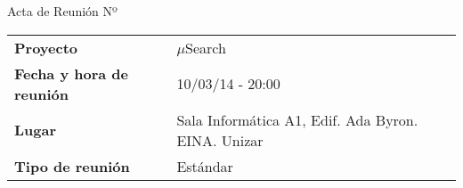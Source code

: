 \begin{center}	
\Large{Acta de Reunión Nº \numeroDeReunion\newline\tituloReunion}
\end{center}
\vspace{1.5em}

\begin{longtable}{ | L{\tabcolsep} |
				     L{\tabcolsep} | }
\hline %
  \\
\hline %
{\bf Proyecto} & $\mu$Search \\
\hline %
{\bf Fecha y hora de reunión} & 10/03/14 - 20:00 \\
\hline %
{\bf Lugar} & Sala Informática A1, Edif. Ada Byron. EINA. Unizar \\
\hline %
{\bf Tipo de reunión} & Estándar \\
\hline %
\end{longtable}


